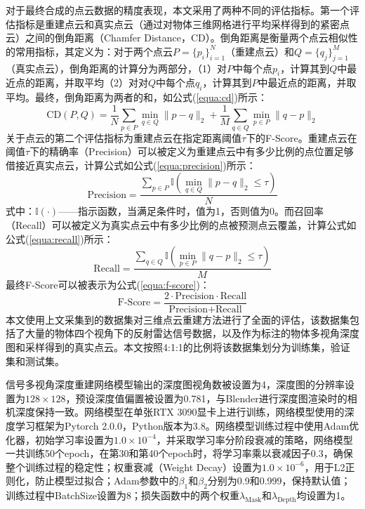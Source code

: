 对于最终合成的点云数据的精度表现，本文采用了两种不同的评估指标。第一个评估指标是重建点云和真实点云（通过对物体三维网格进行平均采样得到的紧密点云）之间的倒角距离（Chamfer Distance，CD）。倒角距离是衡量两个点云相似性的常用指标，其定义为：对于两个点云$P=\{p_i\}_{i=1}^{N}$（重建点云）和$Q=\{q_j\}_{j=1}^{M}$（真实点云），倒角距离的计算分为两部分，（1）对$P$中每个点$p_i$，计算其到$Q$中最近点的距离，并取平均（2）对对$Q$中每个点$q_i$，计算其到$P$中最近点的距离，并取平均。最终，倒角距离为两者的和，如公式(\ref{equa:cd})所示：
\begin{equation}
    \label{equa:cd}
    \text{CD}(P, Q) = \frac{1}{N} \sum_{p \in P} \min_{q \in Q} \| p - q \|_2 + \frac{1}{M} \sum_{q \in Q} \min_{p \in P} \| q - p \|_2
\end{equation}
关于点云的第二个评估指标为重建点云在指定距离阈值$\tau$下的F-Score。重建点云在阈值$\tau$下的精确率（Precision）可以被定义为重建点云中有多少比例的点位置足够借接近真实点云，计算公式如公式(\ref{equa:precision})所示：
\begin{equation}
    \label{equa:precision}
    \text{Precision} = \frac{\sum_{p \in P} \mathbb{I}\left( \min_{q \in Q} \| p - q \|_2 \leq \tau \right)}{N}
\end{equation}
式中：$\mathbb{I}(\cdot)$——指示函数，当满足条件时，值为1，否则值为0。而召回率（Recall）可以被定义为真实点云中有多少比例的点被预测点云覆盖，计算公式如公式(\ref{equa:recall})所示：
\begin{equation}
    \label{equa:recall}
    \text{Recall} = \frac{\sum_{q \in Q} \mathbb{I}\left( \min_{p \in P} \| q - p \|_2 \leq \tau \right)}{M}
\end{equation}
最终F-Score可以被表示为公式(\ref{equa:f-score})：
\begin{equation}
    \label{equa:f-score}
    \text{F-Score} = \frac{2 \cdot \text{Precision} \cdot \text{Recall}}{\text{Precision} + \text{Recall}}
\end{equation}
\label{sec:experiment_setup}
本文使用上文采集到的数据集对三维点云重建方法进行了全面的评估，该数据集包括了大量的物体四个视角下的反射雷达信号数据，以及作为标注的物体多视角深度图和采样得到的真实点云。本文按照4:1:1的比例将该数据集划分为训练集，验证集和测试集。

信号多视角深度重建网络模型输出的深度图视角数被设置为4，深度图的分辨率设置为$128\times 128$，预设深度值偏置被设置为0.781，与Blender进行深度图渲染时的相机深度保持一致。网络模型在单张RTX 3090显卡上进行训练，网络模型使用的深度学习框架为Pytorch 2.0.0，Python版本为3.8。网络模型训练过程中使用Adam优化器，初始学习率设置为$1.0\times 10^{-4}$，并采取学习率分阶段衰减的策略，网络模型一共训练50个epoch，在第30和第40个epoch时，将学习率乘以衰减因子0.3，确保整个训练过程的稳定性；权重衰减（Weight Decay）设置为$1.0\times 10^{-6}$，用于L2正则化，防止模型过拟合；Adam参数中的$\beta_1$和$\beta_2$分别为0.9和0.999，保持默认值；训练过程中BatchSize设置为8；损失函数中的两个权重$\lambda_{\text{Mask}}$和$\lambda_{\text{Depth}}$均设置为1。
